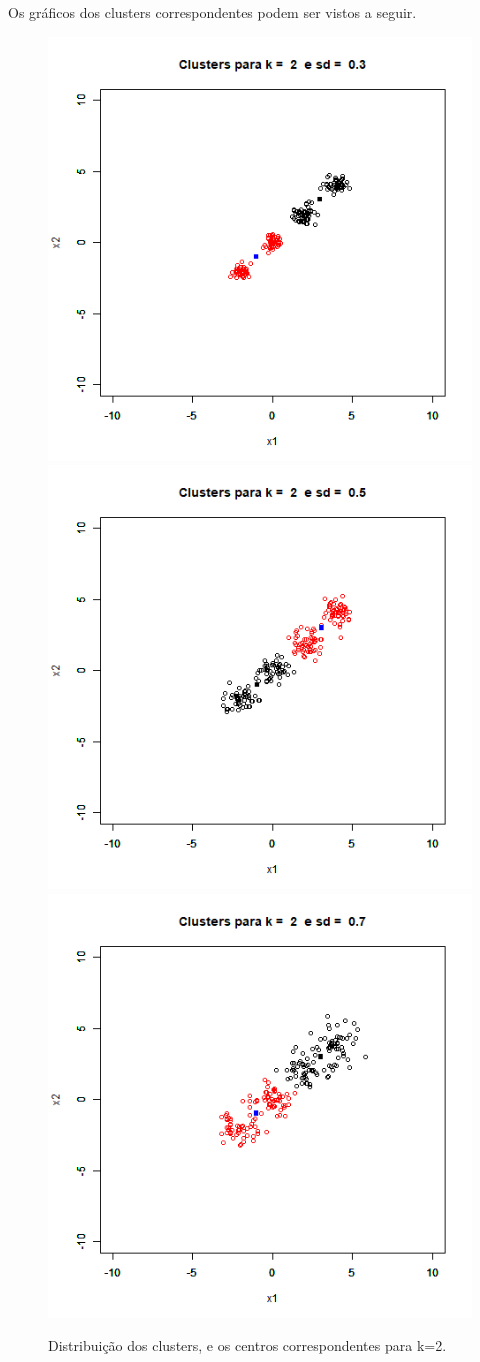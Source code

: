 \documentclass[12pt,a4paper,titlepage]{article}
\begin{document}
Os gráficos dos clusters correspondentes podem ser vistos a seguir.

\begin{figure}[H]
\centering
\includegraphics[width=0.3\linewidth]{k2sd03.png}
\includegraphics[width=0.3\linewidth]{k2sd05.png}
\includegraphics[width=0.3\linewidth]{k2sd07.png}

\caption{Distribuição dos clusters, e os centros correspondentes para k=2.}
\end{figure}
\end{document}
